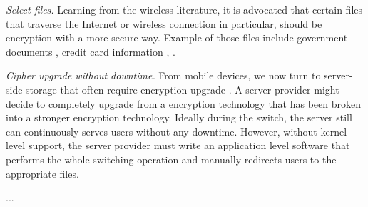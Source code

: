 {\em Select files.}  Learning from the wireless literature, it is
advocated that certain files that traverse the Internet or wireless
connection in particular, should be encryption with a more secure way.
Example of those files include government documents
\cite{citation-to-this-example}, credit card information \cite{a}, \xxx
\cite{a, b, c}.


{\em Cipher upgrade without downtime.}  From mobile devices, we now turn
to server-side storage that often require encryption upgrade
\cite{some-citations}.  A server provider might decide to completely
upgrade from a encryption technology that has been broken into a stronger
encryption technology.  Ideally during the switch, the server still can
continuously serves users without any downtime.  However, without
kernel-level support, the server provider must write an application level
software that performs the whole switching operation and manually
redirects users to the appropriate files.

\newpage
...
